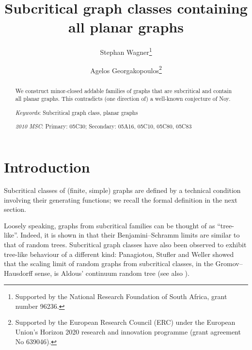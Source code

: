 \documentclass[a4paper]{article}
\title{Subcritical graph classes containing all planar graphs}
\theoremstyle{remark}
\begin{document}
\author[1]{Stephan Wagner\thanks{Supported by the National Research Foundation of South Africa, grant number 96236.}}

\author[2]{Agelos Georgakopoulos\thanks{Supported by the European Research Council (ERC) under the European Union’s Horizon 2020 research and innovation programme (grant agreement No 639046).}}
 

\maketitle

\begin{abstract}
We construct minor-closed addable families of graphs that are subcritical and contain all planar graphs. This contradicts (one direction of) a well-known conjecture of Noy.

\bigskip

\emph{Keywords}: Subcritical graph class, planar graphs

\emph{2010 MSC}:  Primary: 05C30; Secondary: 05A16, 05C10, 05C80, 05C83
\end{abstract}

\section{Introduction} 

Subcritical classes of (finite, simple) graphs are defined by a technical condition involving their generating functions; we recall the formal definition in the next section. 

Loosely speaking, graphs from  subcritical families can be thought of as ``tree-like''. Indeed, it is shown in \cite{Georgakopoulos2015limits,StuRan} that their Benjamini--Schramm limits are similar to that of random trees. Subcritical graph classes have also been observed to exhibit tree-like behaviour of a different kind:  Panagiotou, Stufler and Weller \cite{Panagiotou2016scaling} showed that the scaling limit of random graphs from subcritical classes, in the Gromov--Hausdorff sense, is Aldous' continuum random tree (see also \cite{StuRan}).
\end{document}

